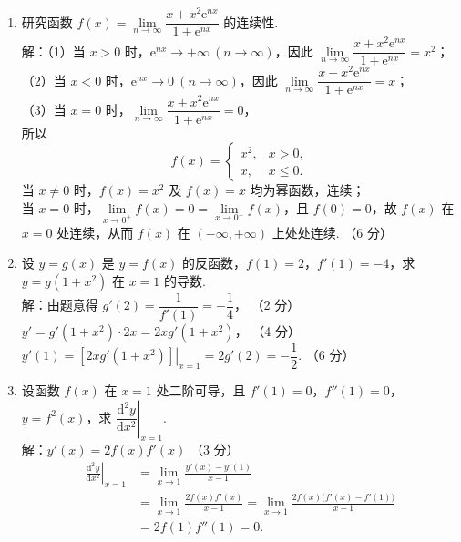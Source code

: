 \documentclass[a4paper,11pt]{ctexart}
\newcommand{\e}{\mathrm{e}}
\newcommand{\dd}{\mathrm{d}}
\newcommand{\score}[1]{\hfill（#1）}
\begin{document}
\begin{enumerate}[label=\arabic*., start=11, leftmargin=2em, itemsep=1.0em, topsep=0.5em]
  \item 研究函数 $f(x) = \lim\limits_{n\to\infty}\dfrac{x + x^2 \e^{nx}}{1 + \e^{nx}}$ 的连续性.\\[0.3em]
  解：（1）当 $x > 0$ 时，$\e^{nx} \to +\infty\ (n\to\infty)$，因此 $\lim\limits_{n\to\infty}\dfrac{x + x^2\e^{nx}}{1 + \e^{nx}} = x^2$；\\[0.2em]
  （2）当 $x < 0$ 时，$\e^{nx} \to 0\ (n\to\infty)$，因此 $\lim\limits_{n\to\infty}\dfrac{x + x^2\e^{nx}}{1 + \e^{nx}} = x$；\\[0.2em]
  （3）当 $x = 0$ 时，$\lim\limits_{n\to\infty}\dfrac{x + x^2\e^{nx}}{1 + \e^{nx}} = 0$，\\[0.2em]
  所以
  \[
    f(x) = \begin{cases} x^2, & x > 0, \\ x, & x \le 0. \end{cases} \tag*{（4 分）}
  \]
  当 $x\neq 0$ 时，$f(x) = x^2$ 及 $f(x) = x$ 均为幂函数，连续；\\[0.2em]
  当 $x = 0$ 时，$\lim\limits_{x\to 0^+} f(x) = 0 = \lim\limits_{x\to 0^-} f(x)$，且 $f(0) = 0$，故 $f(x)$ 在 $x = 0$ 处连续，从而 $f(x)$ 在 $(-\infty, +\infty)$ 上处处连续. \score{6 分}

  \item 设 $y = g(x)$ 是 $y = f(x)$ 的反函数，$f(1) = 2$，$f'(1) = -4$，求 $y = g(1+x^2)$ 在 $x = 1$ 的导数.\\[0.3em]
  解：由题意得 $g'(2) = \dfrac{1}{f'(1)} = -\dfrac{1}{4}$， \score{2 分}\\[0.2em]
  $y' = g'(1+x^2)\cdot 2x = 2xg'(1+x^2)$， \score{4 分}\\[0.2em]
  $y'(1) = \left.[2xg'(1+x^2)]\right|_{x=1} = 2g'(2) = -\dfrac{1}{2}$. \score{6 分}

  \item 设函数 $f(x)$ 在 $x = 1$ 处二阶可导，且 $f'(1) = 0$，$f''(1) = 0$，$y = f^2(x)$，求 $\left.\dfrac{\dd^2 y}{\dd x^2}\right|_{x=1}$.\\[0.3em]
  解：$y'(x) = 2f(x)f'(x)$ \score{3 分}
  \begin{align*}
    \left.\frac{\dd^2 y}{\dd x^2}\right|_{x=1} &= \lim_{x\to 1}\frac{y'(x) - y'(1)}{x - 1} \\
    &= \lim_{x\to 1}\frac{2f(x)f'(x)}{x - 1} = \lim_{x\to 1}\frac{2f(x)\bigl(f'(x) - f'(1)\bigr)}{x - 1} \\
    &= 2f(1)f''(1) = 0. \tag*{（6 分）}
  \end{align*}


\end{enumerate}
\end{document}
